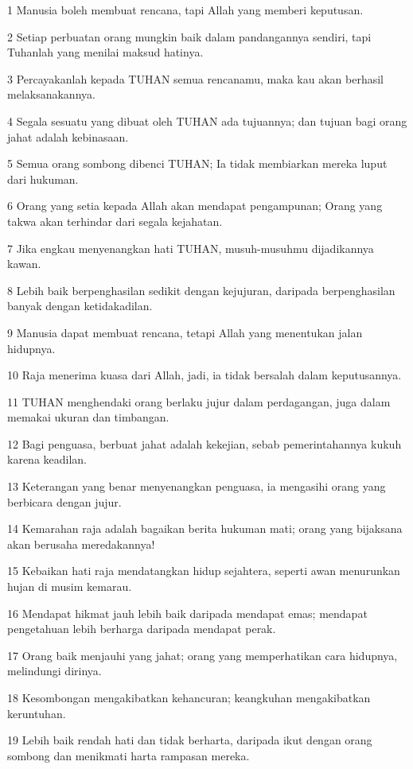 \par 1 Manusia boleh membuat rencana, tapi Allah yang memberi keputusan.
\par 2 Setiap perbuatan orang mungkin baik dalam pandangannya sendiri, tapi Tuhanlah yang menilai maksud hatinya.
\par 3 Percayakanlah kepada TUHAN semua rencanamu, maka kau akan berhasil melaksanakannya.
\par 4 Segala sesuatu yang dibuat oleh TUHAN ada tujuannya; dan tujuan bagi orang jahat adalah kebinasaan.
\par 5 Semua orang sombong dibenci TUHAN; Ia tidak membiarkan mereka luput dari hukuman.
\par 6 Orang yang setia kepada Allah akan mendapat pengampunan; Orang yang takwa akan terhindar dari segala kejahatan.
\par 7 Jika engkau menyenangkan hati TUHAN, musuh-musuhmu dijadikannya kawan.
\par 8 Lebih baik berpenghasilan sedikit dengan kejujuran, daripada berpenghasilan banyak dengan ketidakadilan.
\par 9 Manusia dapat membuat rencana, tetapi Allah yang menentukan jalan hidupnya.
\par 10 Raja menerima kuasa dari Allah, jadi, ia tidak bersalah dalam keputusannya.
\par 11 TUHAN menghendaki orang berlaku jujur dalam perdagangan, juga dalam memakai ukuran dan timbangan.
\par 12 Bagi penguasa, berbuat jahat adalah kekejian, sebab pemerintahannya kukuh karena keadilan.
\par 13 Keterangan yang benar menyenangkan penguasa, ia mengasihi orang yang berbicara dengan jujur.
\par 14 Kemarahan raja adalah bagaikan berita hukuman mati; orang yang bijaksana akan berusaha meredakannya!
\par 15 Kebaikan hati raja mendatangkan hidup sejahtera, seperti awan menurunkan hujan di musim kemarau.
\par 16 Mendapat hikmat jauh lebih baik daripada mendapat emas; mendapat pengetahuan lebih berharga daripada mendapat perak.
\par 17 Orang baik menjauhi yang jahat; orang yang memperhatikan cara hidupnya, melindungi dirinya.
\par 18 Kesombongan mengakibatkan kehancuran; keangkuhan mengakibatkan keruntuhan.
\par 19 Lebih baik rendah hati dan tidak berharta, daripada ikut dengan orang sombong dan menikmati harta rampasan mereka.
